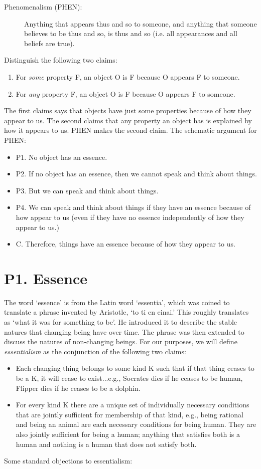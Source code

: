 \documentclass[article,oneside]{memoir}
\begin{document}
\begin{description}
\item[Phenomenalism (PHEN):] Anything that appears thus and so to someone, and anything that someone believes to be thus and so, is thus and so (i.e. all appearances and all beliefs are true).
\end{description}
Distinguish the following two claims:


\begin{enumerate}
\item For \emph{some} property F, an object O is F because O appears F to someone. 
\item For \emph{any} property F,  an object O is F because O appears F to someone. 
\end{enumerate}
The first claims says that objects have just some properties because of how they appear to us. The second claims that any property an object has is explained by how it appears to us. PHEN makes the second claim. The schematic argument for PHEN:
\begin{itemize}
\item P1. No object has an essence.  
\item P2. If no object has an essence, then we cannot speak and think about things. 
\item P3. But we can speak and think about things. 
\item P4. We can speak and think about things if they have an essence because of how appear to us (even if they have no essence independently of how they appear to us.) 
\item C. Therefore, things have an essence because of how they appear to us.  
\end{itemize}

\section{P1. Essence}

The word `essence'  is from the Latin word `essentia', which was coined to translate a phrase invented by Aristotle, `to ti en einai.' This roughly translates as `what it was for something to be'. He introduced it to describe the stable natures that changing being have over time. The phrase was then extended to discuss the natures of non-changing beings. For our purposes, we will define \emph{essentialism} as the conjunction of the following two claims:
\begin{itemize}
\item Each changing thing belongs to some kind K such that if that thing ceases to be a K, it will cease to exist...e.g., Socrates dies if he ceases to be human, Flipper dies if he ceases to be a dolphin. 
\item For every kind K there are a unique set of individually necessary conditions that are jointly sufficient for membership of that kind, e.g., being rational and being an animal are each necessary conditions for being human. They are also jointly sufficient for being a human; anything that satisfies both is a human and nothing is a human that does not satisfy both. 
\end{itemize}
Some standard objections to essentialism: 
\end{document}
